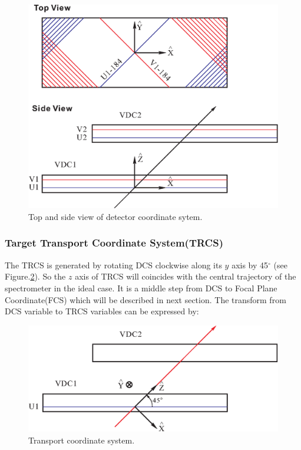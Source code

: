 \begin{figure}
  \begin{center}
	\includegraphics[scale=0.8]{figs/dcs}
  \end{center}
  \caption[Top and side view of detector coordinate sytem]%
  {Top and side view of detector coordinate sytem.}
  \label{fig:dcs}
\end{figure}

\subsubsection{Target Transport Coordinate System(TRCS)}

The TRCS is generated by rotating DCS clockwise along its $y$ axis by
45$^\circ$ (see Figure.\ref{fig:trcs}). So the $z$ axis of TRCS will
coincides with the central trajectory of the spectrometer in the ideal case.
It is a middle step from DCS to Focal Plane Coordinate(FCS) which will be 
described in next section. The transform from DCS variable to TRCS variables
can be expressed by:

\begin{figure}
  \begin{center}
	\includegraphics[scale=0.8]{figs/trcs}
  \end{center}
  \caption[Transport coordinate sytem]%
  {Transport coordinate system.}
  \label{fig:trcs}
\end{figure}

